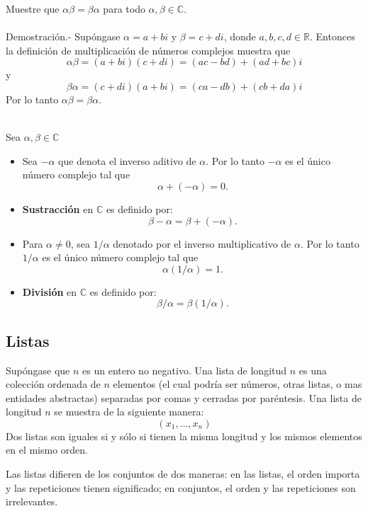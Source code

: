 \begin{teo}[Conmutatividad]
    Muestre que $\alpha \beta = \beta \alpha$ para todo $\alpha,\beta \in \mathbb{C}$.\\\\
    Demostración.-\; Supóngase $\alpha = a+bi$ y $\beta = c+di$, donde $a,b,c,d \in \mathbb{R}$. Entonces la definición de multiplicación de números complejos muestra que 
    $$\alpha \beta = (a+bi)(c+di) = (ac-bd)+(ad+bc)i$$
    y
    $$\beta \alpha = (c+di)(a+bi)=(ca-db)+(cb+da)i$$
    Por lo tanto $\alpha \beta = \beta \alpha$.\\\\
\end{teo}


\begin{tcolorbox}[colback=white]
    \begin{def.} 
	Sea $\alpha, \beta \in \mathbb{C}$
	\begin{itemize}
	    \item Sea $-\alpha$ que denota el inverso aditivo de $\alpha$. Por lo tanto $-\alpha$ es el único número complejo tal que 
		$$\alpha + (-\alpha) = 0.$$

	    \item \textbf{Sustracción} en $\mathbb{C}$ es definido por:
		$$\beta - \alpha = \beta + (-\alpha).$$

	    \item Para $\alpha\neq 0$, sea $1/\alpha$ denotado por el inverso multiplicativo de $\alpha$. Por lo tanto $1/\alpha$ es el único número complejo tal que
		$$\alpha (1/\alpha)=1.$$

	    \item \textbf{División} en $\mathbb{C}$ es definido por:
		$$\beta/\alpha = \beta(1/\alpha).$$
	\end{itemize}
    \end{def.}
\end{tcolorbox}

\subsection{Listas}

\begin{tcolorbox}[colback=white]
    \begin{def.} 
	Supóngase que $n$ es un entero no negativo. Una lista de longitud $n$ es una colección ordenada de $n$ elementos (el cual podría ser números, otras listas, o mas entidades abstractas) separadas por comas y cerradas por paréntesis. Una lista de longitud $n$ se muestra de la siguiente manera:
	$$(x_1,\ldots,x_n)$$
	Dos listas son iguales si y sólo si tienen la misma longitud y los mismos elementos en el mismo orden.
    \end{def.}
\end{tcolorbox}
Las listas difieren de los conjuntos de dos maneras: en las listas, el orden importa y las repeticiones tienen significado; en conjuntos, el orden y las repeticiones son irrelevantes.\\\\

